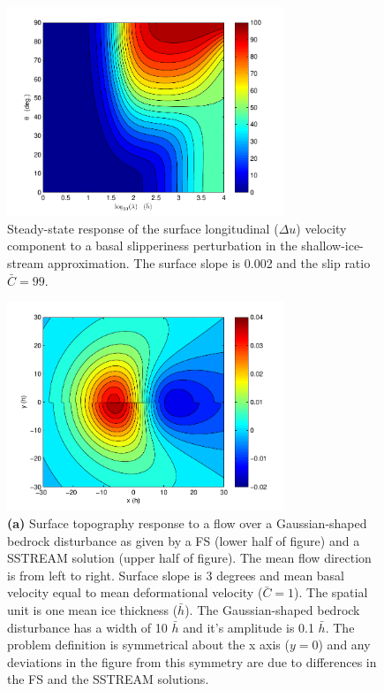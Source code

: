 \documentclass[10pt,a4paper]{book}
\begin{document}
\begin{figure}
\vspace*{2mm}
\centerline{\includegraphics[width=8.3cm]{tc-2007-0016-f12.pdf}}
\caption{Steady-state response of the surface longitudinal
($\Delta u$) velocity component to a basal slipperiness perturbation
in the shallow-ice-stream approximation. The
surface slope is 0.002 and the slip ratio $\bar{C}{=}99$.
\label{fig:SISATuc}}
\end{figure}



\begin{figure}
\vspace*{2mm}
\centerline{\includegraphics[width=8.3cm]{tc-2007-0016-f13a.pdf}}
\caption{{\bf (a)} Surface topography response to a flow over a 
Gaussian-shaped bedrock disturbance
as given by a FS (lower half of figure) and a SSTREAM solution (upper
half of figure). The mean flow direction is from left to
right. Surface slope is 3 degrees and mean basal velocity equal to
mean deformational velocity ($\bar{C}{=}1$). The spatial unit is one
mean ice thickness ($\bar{h}$). The Gaussian-shaped bedrock
disturbance has a width of 10 $\bar{h}$ and it's amplitude is 0.1
$\bar{h}$. The problem definition is symmetrical about the x axis
($y{=}0$) and any deviations in the figure from this symmetry are due
to differences in the FS and the SSTREAM solutions.
\label{fig:GaussTopo}}
\end{figure}
\end{document}
